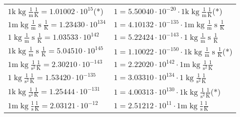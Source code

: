 \begin{center}
\begin{longtable}{l l}
{\color{gray}$1 \bm{\mathrm{ k}}\operatorname{kg}\frac1{\operatorname{m}}{}{}\frac1{\operatorname{K}} = 1.01002\cdot10^{15} $}\quad(*) & {\color{gray}$ 1 = 5.50040\cdot10^{-20} \cdot 1 \bm{\mathrm{ k}}\operatorname{kg}\frac1{\operatorname{m}}{}{}\frac1{\operatorname{K}}$}\quad(*)\\
{\color{gray}$1 \bm{\mathrm{ m}}\operatorname{kg}\frac1{\operatorname{m}}{\operatorname{s}}{}\frac1{\operatorname{K}} = 1.23430\cdot10^{134} $}   & {\color{gray}$ 1 = 4.10132\cdot10^{-135} \cdot 1 \bm{\mathrm{ m}}\operatorname{kg}\frac1{\operatorname{m}}{\operatorname{s}}{}\frac1{\operatorname{K}}$}  \\
{\color{black}$1 \bm{\mathrm{ }}\operatorname{kg}\frac1{\operatorname{m}}{\operatorname{s}}{}\frac1{\operatorname{K}} = 1.03533\cdot10^{142} $}   & {\color{black}$ 1 = 5.22424\cdot10^{-143} \cdot 1 \bm{\mathrm{ }}\operatorname{kg}\frac1{\operatorname{m}}{\operatorname{s}}{}\frac1{\operatorname{K}}$}  \\
{\color{gray}$1 \bm{\mathrm{ k}}\operatorname{kg}\frac1{\operatorname{m}}{\operatorname{s}}{}\frac1{\operatorname{K}} = 5.04510\cdot10^{145} $}   & {\color{gray}$ 1 = 1.10022\cdot10^{-150} \cdot 1 \bm{\mathrm{ k}}\operatorname{kg}\frac1{\operatorname{m}}{\operatorname{s}}{}\frac1{\operatorname{K}}$}\quad(*)\\
{\color{gray}$1 \bm{\mathrm{ m}}\operatorname{kg}{}\frac1{\operatorname{s}^2}{}\frac1{\operatorname{K}} = 2.30210\cdot10^{-143} $}   & {\color{gray}$ 1 = 2.22020\cdot10^{142} \cdot 1 \bm{\mathrm{ m}}\operatorname{kg}{}\frac1{\operatorname{s}^2}{}\frac1{\operatorname{K}}$}  \\
{\color{black}$1 \bm{\mathrm{ }}\operatorname{kg}{}\frac1{\operatorname{s}^2}{}\frac1{\operatorname{K}} = 1.53420\cdot10^{-135} $}   & {\color{black}$ 1 = 3.03310\cdot10^{134} \cdot 1 \bm{\mathrm{ }}\operatorname{kg}{}\frac1{\operatorname{s}^2}{}\frac1{\operatorname{K}}$}  \\
{\color{gray}$1 \bm{\mathrm{ k}}\operatorname{kg}{}\frac1{\operatorname{s}^2}{}\frac1{\operatorname{K}} = 1.25444\cdot10^{-131} $}   & {\color{gray}$ 1 = 4.00313\cdot10^{130} \cdot 1 \bm{\mathrm{ k}}\operatorname{kg}{}\frac1{\operatorname{s}^2}{}\frac1{\operatorname{K}}$}\quad(*)\\
{\color{gray}$1 \bm{\mathrm{ m}}\operatorname{kg}{}\frac1{\operatorname{s}}{}\frac1{\operatorname{K}} = 2.03121\cdot10^{-12} $}   & {\color{gray}$ 1 = 2.51212\cdot10^{11} \cdot 1 \bm{\mathrm{ m}}\operatorname{kg}{}\frac1{\operatorname{s}}{}\frac1{\operatorname{K}}$}  \\

\end{longtable}
\end{center}
